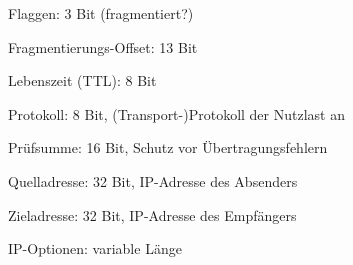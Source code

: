 \documentclass[a4paper]{article}
\begin{document}
\begin{multicols}{3}
\begin{itemize*}
            \item Flaggen: 3 Bit (fragmentiert?)
            \item Fragmentierungs-Offset: 13 Bit
            \item Lebenszeit (TTL): 8 Bit
            \item Protokoll: 8 Bit, (Transport-)Protokoll der Nutzlast an
            \item Prüfsumme: 16 Bit, Schutz vor Übertragungsfehlern
            \item Quelladresse: 32 Bit, IP-Adresse des Absenders
            \item Zieladresse: 32 Bit, IP-Adresse des Empfängers
            \item IP-Optionen: variable Länge
      \end{itemize*}


\end{multicols}
\end{document}

